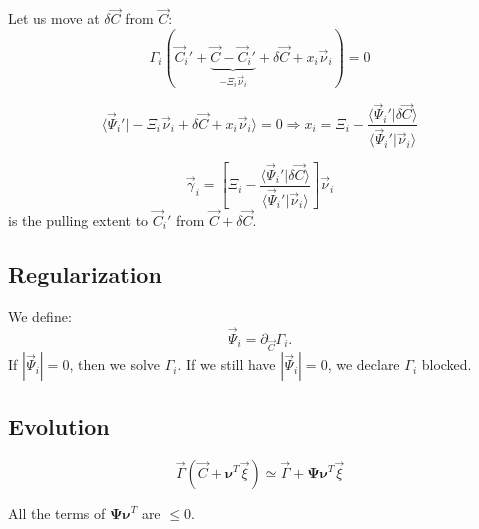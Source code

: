 \documentclass[aps,12pt]{revtex4}
\begin{document}
Let us move at $\delta \vec{C}$ from $\vec{C}$:
\begin{equation}
	\Gamma_i\left(\vec{C}_i' + \underbrace{\vec{C} - \vec{C}_i'}_{-\Xi_i \vec{\nu}_i} + \delta\vec{C} + x_i \vec{\nu}_i \right) = 0
\end{equation}

\begin{equation}
	\langle \vec{\Psi}_i' \vert -\Xi_i \vec{\nu}_i + \delta\vec{C} + x_i \vec{\nu}_i \rangle = 0
	 \Rightarrow 
	 x_i = \Xi_i - \dfrac{\langle \vec{\Psi}_i'\vert\delta\vec{C}\rangle}{\langle \vec{\Psi}_i' \vert \vec{\nu}_i \rangle} 
\end{equation}

\begin{equation}
	\vec{\gamma}_i = 
	\left[ \Xi_i - \dfrac{\langle \vec{\Psi}_i'\vert\delta\vec{C}\rangle}{\langle \vec{\Psi}_i' \vert \vec{\nu}_i \rangle} \right] \vec{\nu}_i
\end{equation} 
is the pulling extent to $\vec{C}_i'$ from $\vec{C}+\delta\vec{C}$.
 	 	
\subsection{Regularization}
We define:
\begin{equation}
\vec{\Psi}_i = \partial_{\vec{C}} \Gamma_i.
\end{equation}
If $|\vec{\Psi}_i|=0$, then we solve $\Gamma_i$. If we still have $|\vec{\Psi}_i|=0$, we declare $\Gamma_i$ blocked.

\subsection{Evolution}

\begin{equation}
	\vec{\Gamma}(\vec{C}+\bm{\nu}^T \vec{\xi}) \simeq \vec{\Gamma} + \bm{\Psi} \bm{\nu}^T \vec{\xi}
\end{equation}	

All the terms of $	\bm{\Psi} \bm{\nu}^T $ are $\leq 0$.




 


 
\end{document}
